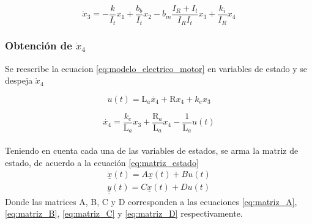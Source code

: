 \documentclass[conference]{IEEEtran}
\begin{document}
\begin{equation}
    \dot{x}_3 = -\frac{k}{I_t}x_1 + \frac{b_b}{I_t}x_2 - b_m\frac{I_R+I_t}{I_RI_t}x_3 + \frac{k_i}{I_R}x_4
\label{eq:x'3_ecuacion}
\end{equation}
\subsubsection{Obtención de $\dot{x}_4$}
Se reescribe la ecuacion \eqref{eq:modelo_electrico_motor} en variables de estado y se despeja $\dot{x}_4$

\begin{equation*}
    u(t)=\text{L}_a\dot{x_4}+\text{R}x_4+k_ex_3
\end{equation*}


\begin{equation}
    \dot{x_4}= \frac{k_e}{\text{L}_a}x_3+\frac{\text{R}_a}{\text{L}_a}x_4-\frac{1}{\text{L}_a}u(t)
\label{eq:x'4_ecuacion}
\end{equation}
\\
Teniendo en cuenta cada una  de las variables de estados, se arma la matriz de estado, de acuerdo a la ecuación \eqref{eq:matriz_estado}
\begin{equation}
    \begin{matrix}
       \dot{\underline{x}}(t)= A \underline{x}(t) + B u(t) \\
       \underline{y}(t)= C \underline{x}(t) + D u(t)
    \end{matrix}
    \label{eq:matriz_estado}
\end{equation}
Donde las matrices A, B, C y D corresponden a las ecuaciones \eqref{eq:matriz_A}, \eqref{eq:matriz_B}, \eqref{eq:matriz_C} y \eqref{eq:matriz_D} respectivamente.
\end{document}
